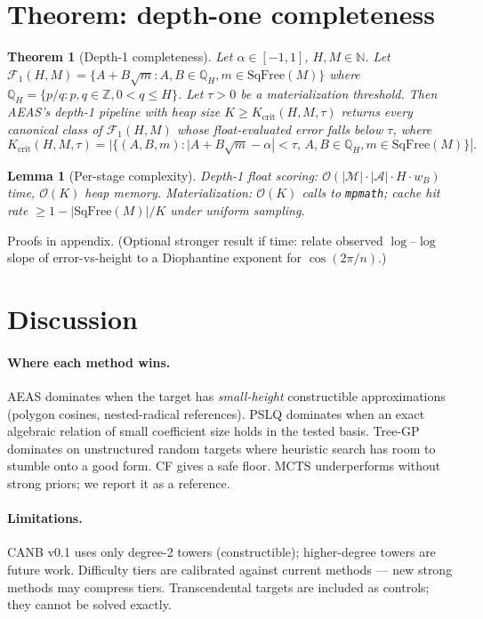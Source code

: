\documentclass[11pt]{article}
\newtheorem{theorem}{Theorem}
\newtheorem{lemma}{Lemma}
\begin{document}
\section{Theorem: depth-one completeness}
\label{sec:theory}

\begin{theorem}[Depth-1 completeness]
Let $\alpha \in [-1, 1]$, $H, M \in \mathbb{N}$. Let $\mathcal{F}_{1}(H, M) = \{ A + B\sqrt{m} : A, B \in \mathbb{Q}_H, m \in \mathrm{SqFree}(M) \}$ where $\mathbb{Q}_H = \{ p/q : p, q \in \mathbb{Z}, 0 < q \le H \}$. Let $\tau > 0$ be a materialization threshold. Then AEAS's depth-1 pipeline with heap size $K \ge K_{\mathrm{crit}}(H, M, \tau)$ returns every canonical class of $\mathcal{F}_{1}(H, M)$ whose float-evaluated error falls below $\tau$, where
\[
  K_{\mathrm{crit}}(H, M, \tau) = |\{ (A, B, m) : |A + B\sqrt{m} - \alpha| < \tau,\, A, B \in \mathbb{Q}_H, m \in \mathrm{SqFree}(M) \}|.
\]
\end{theorem}

\begin{lemma}[Per-stage complexity]
Depth-1 float scoring: $\mathcal{O}(|\mathcal{M}| \cdot |\mathcal{A}| \cdot H \cdot w_B)$ time, $\mathcal{O}(K)$ heap memory. Materialization: $\mathcal{O}(K)$ calls to \texttt{mpmath}; cache hit rate $\ge 1 - |\mathrm{SqFree}(M)|/K$ under uniform sampling.
\end{lemma}

Proofs in appendix. (Optional stronger result if time: relate observed $\log$--$\log$ slope of error-vs-height to a Diophantine exponent for $\cos(2\pi/n)$.)

\section{Discussion}
\label{sec:discussion}

\paragraph{Where each method wins.} AEAS dominates when the target has \emph{small-height} constructible approximations (polygon cosines, nested-radical references). PSLQ dominates when an exact algebraic relation of small coefficient size holds in the tested basis. Tree-GP dominates on unstructured random targets where heuristic search has room to stumble onto a good form. CF gives a safe floor. MCTS underperforms without strong priors; we report it as a reference.

\paragraph{Limitations.} CANB v0.1 uses only degree-2 towers (constructible); higher-degree towers are future work. Difficulty tiers are calibrated against current methods — new strong methods may compress tiers. Transcendental targets are included as controls; they cannot be solved exactly.
\end{document}
